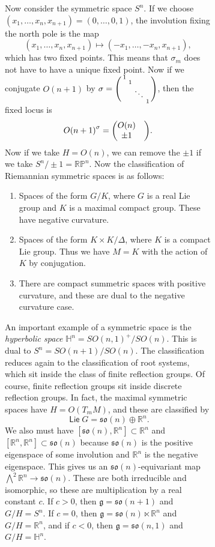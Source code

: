 \documentclass[leqno, openany]{memoir}
\theoremstyle{definition}
\theoremstyle{remark}
\theoremstyle{plain}
\theoremstyle{definition}
\theoremstyle{remark}
\newcommand{\R}{\mathbb{R}}
\renewcommand{\H}{\mathbb{H}}
\renewcommand{\P}{\mathbb{P}}
\newcommand{\mf}[1]{\mathfrak{#1}}
\DeclareMathOperator{\Lie}{\mathsf{Lie}}
\begin{document}
\begin{figure}[H]
\begin{figure}[H]
Now consider the symmetric space $S^n$. If we choose $( x_1, \ldots, x_n,
x_{n+1} ) = (0,\ldots,0, 1)$, the involution fixing the north pole is the map
\[ (x_1, \ldots, x_n, x_{n+1}) \mapsto (-x_1, \ldots, -x_n, x_{n+1}), \] which
has two fixed points. This means that $\sigma_m$ does not have to have a unique
fixed point. Now if we conjugate $O(n+1)$ by $\sigma = \begin{psmallmatrix} 1 &
& \\ & 1 & \\ & & \ddots \\ & & & 1 \end{psmallmatrix}$, then the fixed locus
    is \[ {O(n+1)}^{\sigma} = \mqty(O(n) & \\ \pm 1 & ). \] Now if we take $H =
    O(n)$, we can remove the $\pm 1$ if we take $S^n/\pm 1 = \R\P^n$. Now the
    classification of Riemannian symmetric spaces is as follows:
    \begin{enumerate} \item Spaces of the form $G/K$, where $G$ is a real Lie
        group and $K$ is a maximal compact group. These have negative
        curvature.  \item Spaces of the form $K \times K / \Delta$, where $K$
        is a compact Lie group. Thus we have $M = K$ with the action of $K$ by
        conjugation.  \item There are compact summetric spaces with positive
curvature, and these are dual to the negative curvature case.  \end{enumerate}

An important example of a symmetric space is the \textit{hyperbolic space}
$\H^n = { SO(n,1) }^+ / SO(n)$. This is dual to $S^n = SO(n+1)/SO(n)$. The
classification reduces again to the classification of root systems, which sit
inside the class of finite reflection groups. Of course, finite reflection
groups sit inside discrete reflection groups. In fact, the maximal symmetric
spaces have $H = O(T_m M)$, and these are classified by \[ \Lie G = \mf{so}(n)
\oplus \R^n. \] We also must have $[\mf{so}(n), \R^n] \subset \R^n$ and $[\R^n,
\R^n] \subset \mf{so}(n)$ because $\mf{so}(n)$ is the positive eigenspace of
some involution and $\R^n$ is the negative eigenspace. This gives us an
$\mf{so}(n)$-equivariant map $\bigwedge^2 \R^n \to \mf{so}(n)$. These are both
irreducible and isomorphic, so these are multiplication by a real constant $c$.
If $c > 0$, then $\mf{g} = \mf{so}(n+1)$ and $G/H = S^n$. If $c = 0$, then
$\mf{g} = \mf{so}(n) \ltimes \R^n$ and $G/H = \R^n$, and if $c < 0$, then
$\mf{g} = \mf{so}(n,1)$ and $G/H = \H^n$.


\end{figure}
\end{figure}
\end{document}
